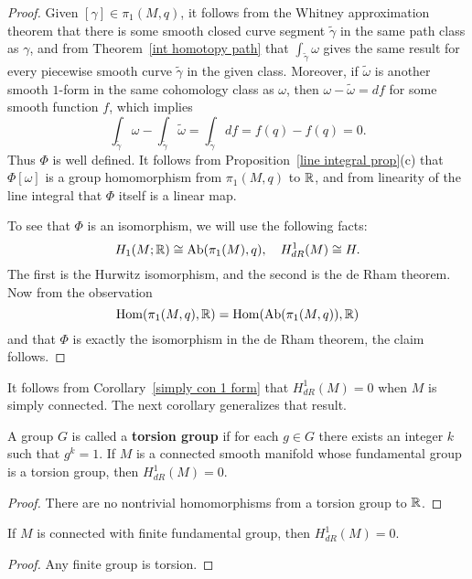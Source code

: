 \begin{proof}
Given $[\gamma]\in\pi_1(M,q)$, it follows from the Whitney approximation theorem that there is some smooth closed curve segment $\widetilde{\gamma}$ in the same path class as $\gamma$, and from Theorem~\ref{int homotopy path} that $\int_{\widetilde{\gamma}}\omega$ gives the same result for every piecewise smooth curve $\widetilde{\gamma}$ in the given class. Moreover, if $\widetilde{\omega}$ is another smooth $1$-form in the same cohomology class as $\omega$, then $\omega-\widetilde{\omega}=df$ for some smooth function $f$, which implies
\[\int_{\widetilde{\gamma}}\omega-\int_{\widetilde{\gamma}}\widetilde{\omega}=\int_{\widetilde{\gamma}}df=f(q)-f(q)=0.\]
Thus $\varPhi$ is well defined. It follows from Proposition~\ref{line integral prop}(c) that $\varPhi[\omega]$ is a group homomorphism from $\pi_1(M,q)$ to $\mathbb{R}$, and 
from linearity of the line integral that $\varPhi$ itself is a linear map.\par
To see that $\varPhi$ is an isomorphism, we will use the following facts:
\[H_1(M;\mathbb{R})\cong\mathrm{Ab}(\pi_1(M),q),\quad H^1_{dR}(M)\cong H.\]
The first is the Hurwitz isomorphism, and the second is the de Rham theorem. Now from the observation
\[\mathrm{Hom}(\pi_1(M,q),\mathbb{R})=\mathrm{Hom}(\mathrm{Ab}(\pi_1(M,q)),\mathbb{R})\]
and that $\varPhi$ is exactly the isomorphism in the de Rham theorem, the claim follows.
\end{proof}
It follows from Corollary~\ref{simply con 1 form} that $H^1_{dR}(M)=0$ when $M$ is simply connected. The next corollary generalizes that result.
\begin{proposition}
A group $G$ is called a \textbf{torsion group} if for each $g\in G$ there exists an integer $k$ such that $g^k=1$. If $M$ is a connected smooth manifold whose fundamental group is a torsion group, then $H^1_{dR}(M)=0$.
\end{proposition}
\begin{proof}
There are no nontrivial homomorphisms from a torsion group to $\mathbb{R}$.
\end{proof}
\begin{corollary}\label{cohomology fundamental finite}
If $M$ is connected with finite fundamental group, then $H^1_{dR}(M)=0$.
\end{corollary}
\begin{proof}
Any finite group is torsion.
\end{proof}
